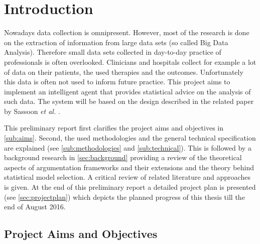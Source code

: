 \section{Introduction}

Nowadays data collection is omnipresent. However, most of the research is done on the extraction of information from large data sets (so called Big Data Analysis). Therefore small data sets collected in day-to-day practice of professionals is often overlooked. 
Clinicians and hospitals collect for example a lot of data on their patients, the used therapies and the outcomes. Unfortunately this data is often not used to inform future practice. This project aims to implement an intelligent agent that provides statistical advice on the analysis of such data. The system will be based on the design described in the related paper by Sassoon \textit{et al.} \cite{sassoon2014}.

This preliminary report first clarifies the project aims and objectives in \autoref{sub:aims}. Second, the used methodologies and the general technical specification are explained (see \autoref{sub:methodologies} and \autoref{sub:technical}). This is followed by a background research in \autoref{sec:background} providing a review of the theoretical aspects of argumentation frameworks and their extensions and the theory behind statistical model selection. A critical review of related literature and approaches is given. At the end of this preliminary report a detailed project plan is presented (see \autoref{sec:projectplan}) which depicts the planned progress of this thesis till the end of August 2016.

\subsection{Project Aims and Objectives} 
\label{sub:aims}

